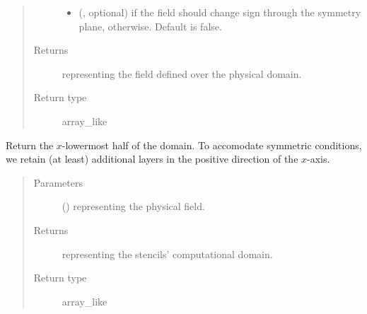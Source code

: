 \documentclass[letterpaper,10pt,english]{sphinxmanual}
\begin{document}
\begin{fulllineitems}
\begin{fulllineitems}
\begin{quote}
\begin{description}
\begin{itemize}
\item {} 
 (, optional) \textendash{}  if the field should change sign through the symmetry plane,  otherwise.
Default is false.

\end{itemize}

\item[{Returns}] \leavevmode
{} representing the field defined over the physical domain.

\item[{Return type}] \leavevmode
array\_like

\end{description}\end{quote}

\end{fulllineitems}


\begin{fulllineitems}
\label{\detokenize{api:tasmania.dycore.horizontal_boundary_relaxed.RelaxedSymmetricYZ.from_physical_to_computational_domain}}
Return the \(x\)-lowermost half of the domain. To accomodate symmetric conditions,
we retain (at least)  additional layers in the positive direction of the \(x\)-axis.
\begin{quote}\begin{description}
\item[{Parameters}] \leavevmode
{} () \textendash{}  representing the physical field.

\item[{Returns}] \leavevmode
{} representing the stencils’ computational domain.

\item[{Return type}] \leavevmode
array\_like


\end{description}
\end{quote}
\end{fulllineitems}
\end{fulllineitems}
\end{document}
